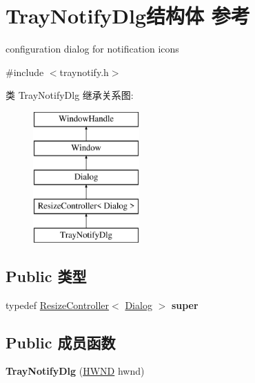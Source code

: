 \hypertarget{struct_tray_notify_dlg}{}\section{Tray\+Notify\+Dlg结构体 参考}
\label{struct_tray_notify_dlg}


configuration dialog for notification icons  




{\ttfamily \#include $<$traynotify.\+h$>$}

类 Tray\+Notify\+Dlg 继承关系图\+:\begin{figure}[H]
\begin{center}
\leavevmode
\includegraphics[height=5.000000cm]{struct_tray_notify_dlg}
\end{center}
\end{figure}
\subsection*{Public 类型}
\begin{DoxyCompactItemize}
\item 
\mbox{\label{struct_tray_notify_dlg_aed216dd15eecddcce6ec91bc3336c9fb}} 
typedef \hyperlink{struct_resize_controller}{Resize\+Controller}$<$ \hyperlink{struct_dialog}{Dialog} $>$ {\bfseries super}
\end{DoxyCompactItemize}
\subsection*{Public 成员函数}
\begin{DoxyCompactItemize}
\item 
\mbox{\label{struct_tray_notify_dlg_a2f79eb0c6959d53815c8870fba78fc12}} 
{\bfseries Tray\+Notify\+Dlg} (\hyperlink{interfacevoid}{H\+W\+ND} hwnd)
\end{DoxyCompactItemize}
